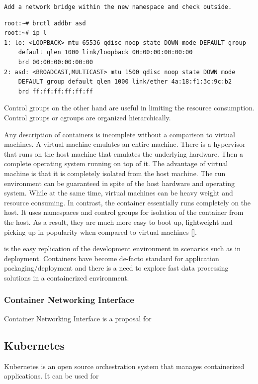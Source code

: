 \documentclass[english, 12pt, a4paper, elec, utf8, a-1b, online]{aaltothesis}
\begin{document}
\texttt{Add a network bridge within the new namespace and check outside.}

\begin{lstlisting}[basicstyle={\small\ttfamily}]
root:~# brctl addbr asd
root:~# ip l
1: lo: <LOOPBACK> mtu 65536 qdisc noop state DOWN mode DEFAULT group
    default qlen 1000 link/loopback 00:00:00:00:00:00
    brd 00:00:00:00:00:00
2: asd: <BROADCAST,MULTICAST> mtu 1500 qdisc noop state DOWN mode
    DEFAULT group default qlen 1000 link/ether 4a:18:f1:3c:9c:b2
    brd ff:ff:ff:ff:ff:ff
\end{lstlisting}

Control groups on the other hand are useful in limiting the resource consumption. Control groups or cgroups are organized hierarchically. 

Any description of containers is incomplete without a comparison to virtual machines. A virtual machine emulates an entire machine. There is a hypervisor that runs on the host machine that emulates the underlying hardware. Then a complete operating system running on top of it. The advantage of virtual machine is that it is completely isolated from the host machine. The run environment can be guaranteed in spite of the host hardware and operating system. While at the same time, virtual machines can be heavy weight and resource consuming. In contrast, the container essentially runs completely on the host. It uses namespaces and control groups for isolation of the container from the host. As a result, they are much more easy to boot up, lightweight and picking up in popularity when compared to virtual machines [].


is the easy replication of the development environment in scenarios such as in deployment. Containers have become de-facto standard for application packaging/deployment and there is a need to explore fast data processing solutions in a containerized environment.

\subsubsection{Container Networking Interface}
Container Networking Interface is a proposal for 

\subsection{Kubernetes}
Kubernetes is an open source orchestration system that manages containerized applications. It can be used for 
\end{document}
